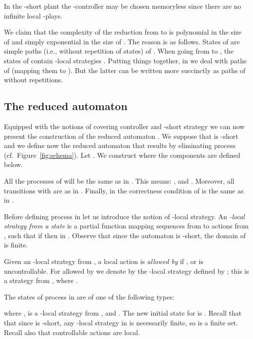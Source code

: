 \documentclass[10pt,a4paper]{article}
\newcommand{\igw}[1]{}
\begin{document}
\medskip

\begin{corollary}
  In the -short plant  the -controller may be chosen
  memoryless since there are no infinite local -plays.\igw{remove corollary?}
\end{corollary}


\begin{remark}
  We claim that the complexity of the reduction from  to  is
  polynomial in the size of  and simply exponential in the size
  of . The reason is as follows. States of  are
  simple paths  (i.e., without repetition of states) of . When going from
   to , the states of  contain -local
  strategies . Putting things together, in 
  we deal with paths of  (mapping them to ). But the latter
  can be written more succinctly as paths of  without repetitions.
\end{remark}






\subsection{The reduced automaton }\label{sec:new} 
Equipped with the notions of covering controller and -short strategy
we can now present the construction of the reduced automaton . We suppose that  is
-short and we define now the reduced automaton  that results
by eliminating process  (cf.\ Figure~\ref{fig:schema}).  Let
.  We construct
 where the
components are defined below.

All the processes  of  will be the same as in
. This means: , and . Moreover, all
transitions  with  are as in
. Finally, in  the  correctness condition of 
is the same as in .

Before defining process  in  let us introduce the notion
of -local strategy. An \emph{-local strategy from a state
  } is a partial function 
mapping sequences from  to actions from , such that
if  then  in .  Observe that since the
automaton  is -short, the domain of  is finite.

Given an -local strategy  from , a local action  is \emph{allowed by }
if , or  is uncontrollable. For  allowed by 
 we
denote by  the -local strategy defined by
; this is a strategy from , where . 






The states of process  in  are of one of the following types:

where ,  is a -local strategy from ,
and . The new initial state for  is 
. 
Recall that that since  is -short, any -local strategy in  is
necessarily finite, so  is a finite set. Recall also
  that controllable actions are local.
\end{document}
